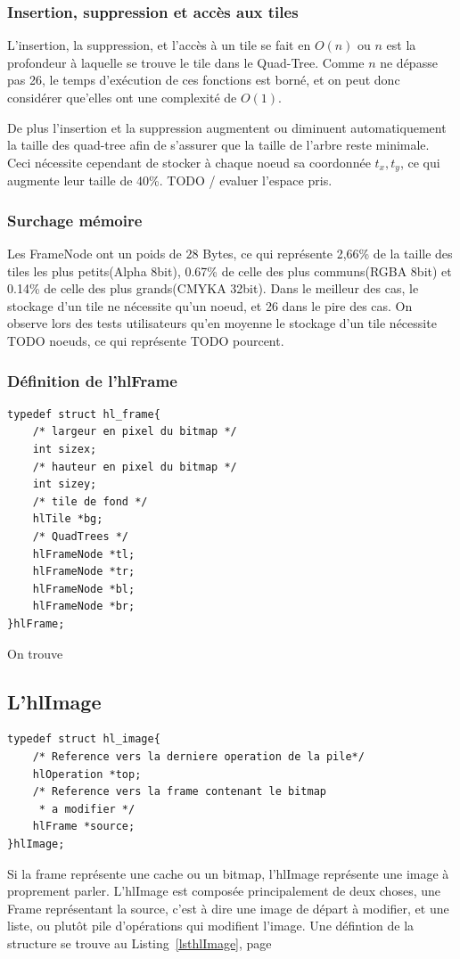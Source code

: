 			\subsubsection{Insertion, suppression et accès aux tiles}
				L'insertion, la suppression, et l'accès à un tile se fait en $O(n)$ ou $n$ est la profondeur à laquelle se trouve le tile dans 
				le Quad-Tree. Comme $n$ ne dépasse pas 26, le temps d'exécution de ces fonctions est borné, et on peut donc considérer que'elles
				ont une complexité de $O(1)$. 
				
				De plus l'insertion et la suppression augmentent ou diminuent automatiquement la taille des 
				quad-tree afin de s'assurer que la taille de l'arbre reste minimale. Ceci nécessite cependant de stocker à chaque noeud 
				sa coordonnée $t_x,t_y$, ce qui augmente leur taille de 40\%. TODO / evaluer l'espace pris.

			\subsubsection{Surchage mémoire}
				Les FrameNode ont un poids de $28$ Bytes, ce qui représente 2,66\% de la taille des tiles les plus petits(Alpha 8bit), 0.67\% de celle des plus
				communs(RGBA 8bit)  et 0.14\% de celle des plus grands(CMYKA 32bit). Dans le meilleur des cas, le stockage d'un tile ne 
				nécessite qu'un noeud, et 26 dans le pire des cas. On observe lors des tests utilisateurs qu'en moyenne le stockage d'un tile
				nécessite TODO noeuds, ce qui représente TODO pourcent.
			\subsubsection{Définition de l'hlFrame}
		\begin{lstlisting}[float,caption={Définition des hlFrames },frame=tb,label=lsthlFrame]
typedef struct hl_frame{
	/* largeur en pixel du bitmap */
	int sizex;
	/* hauteur en pixel du bitmap */
	int sizey;
	/* tile de fond */
	hlTile *bg;
	/* QuadTrees */
	hlFrameNode *tl;
	hlFrameNode *tr;
	hlFrameNode *bl;
	hlFrameNode *br;
}hlFrame;
		\end{lstlisting}
				On trouve 

		\subsection{L'hlImage}
		\begin{lstlisting}[float,caption={Définition des hlImages },frame=tb,label=lsthlImage]
typedef struct hl_image{
	/* Reference vers la derniere operation de la pile*/
	hlOperation *top;
	/* Reference vers la frame contenant le bitmap 
	 * a modifier */
	hlFrame *source;
}hlImage;
		\end{lstlisting}
		Si la frame représente une cache ou un bitmap, l'hlImage représente une image à proprement parler. L'hlImage est composée principalement
		de deux choses, une Frame représentant la source, c'est à dire une image de départ à modifier, et une liste, ou plutôt pile d'opérations
		qui modifient l'image.	
		Une défintion de la structure se trouve au Listing~\ref{lsthlImage}, page~\pageref{lsthlImage} 
